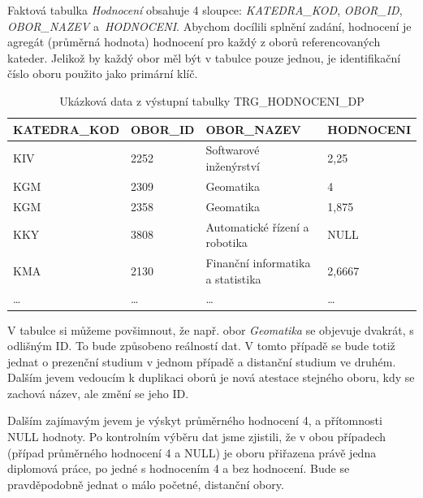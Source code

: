 Faktová tabulka \textit{Hodnocení} obsahuje 4 sloupce: \textit{KATEDRA\_KOD}, \textit{OBOR\_ID}, \textit{OBOR\_NAZEV} a~\textit{HODNOCENI}.
Abychom docílili splnění zadání, hodnocení je agregát (průměrná hodnota) hodnocení pro každý z oborů referencovaných kateder.
Jelikož by každý obor měl být v tabulce pouze jednou, je identifikační číslo oboru použito jako primární klíč.

\begin{table}[htb]
    \centering

    \begin{tabular}{llll}
        \toprule

        KATEDRA\_KOD    & OBOR\_ID  & OBOR\_NAZEV                       & HODNOCENI \\ \midrule
        KIV             & 2252      & Softwarové inženýrství            & 2,25      \\
        KGM             & 2309      & Geomatika                         & 4         \\
        KGM             & 2358      & Geomatika                         & 1,875     \\
        KKY             & 3808      & Automatické řízení a robotika     & NULL      \\
        KMA             & 2130      & Finanční informatika a statistika & 2,6667    \\
        \ldots          & \ldots    & \ldots                            & \ldots    \\

        \bottomrule
    \end{tabular}

    \caption{Ukázková data z výstupní tabulky TRG\_HODNOCENI\_DP}
    \label{table:table2}
\end{table}
\FloatBarrier

V tabulce si můžeme povšimnout, že např. obor \textit{Geomatika} se objevuje dvakrát, s odlišným ID.
To bude způsobeno reálností dat.
V tomto případě se bude totiž jednat o prezenční studium v jednom případě a distanční studium ve druhém.
Dalším jevem vedoucím k duplikaci oborů je nová atestace stejného oboru, kdy se zachová název, ale změní se jeho ID.

Dalším zajímavým jevem je výskyt průměrného hodnocení 4, a přítomnosti NULL hodnoty.
Po kontrolním výběru dat jsme zjistili, že v obou případech (případ průměrného hodnocení 4 a NULL) je oboru přiřazena právě jedna diplomová práce, po jedné s hodnocením 4 a bez hodnocení.
Bude se pravděpodobně jednat o málo početné, distanční obory.

